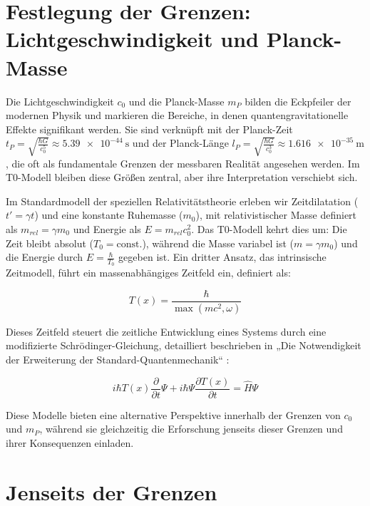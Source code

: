 \documentclass[a4paper,12pt]{article}
\newcommand{\Tfield}{T(x)}
\begin{document}
	\section{Festlegung der Grenzen: \\Lichtgeschwindigkeit und Planck-Masse}
	
	Die Lichtgeschwindigkeit \(c_0\) und die Planck-Masse \(m_P\) bilden die Eckpfeiler der modernen Physik und markieren die Bereiche, in denen quantengravitationelle Effekte signifikant werden. Sie sind verknüpft mit der Planck-Zeit \(t_P = \sqrt{\frac{\hbar G}{c_0^5}} \approx \SI{5.39e-44}{\second}\) und der Planck-Länge \(l_P = \sqrt{\frac{\hbar G}{c_0^3}} \approx \SI{1.616e-35}{\meter}\), die oft als fundamentale Grenzen der messbaren Realität angesehen werden. Im T0-Modell bleiben diese Größen zentral, aber ihre Interpretation verschiebt sich.
	
	Im Standardmodell der speziellen Relativitätstheorie erleben wir Zeitdilatation (\(t' = \gamma t\)) und eine konstante Ruhemasse (\(m_0\)), mit relativistischer Masse definiert als \(m_{rel} = \gamma m_0\) und Energie als \(E = m_{rel} c_0^2\). Das T0-Modell kehrt dies um: Die Zeit bleibt absolut (\(T_0 = \text{const.}\)), während die Masse variabel ist (\(m = \gamma m_0\)) und die Energie durch \(E = \frac{\hbar}{T_0}\) gegeben ist. Ein dritter Ansatz, das intrinsische Zeitmodell, führt ein massenabhängiges Zeitfeld ein, definiert als:
	
	\begin{equation}
		\Tfield = \frac{\hbar}{\max(m c^2, \omega)}
	\end{equation}
	
	Dieses Zeitfeld steuert die zeitliche Entwicklung eines Systems durch eine modifizierte Schrödinger-Gleichung, detailliert beschrieben in „Die Notwendigkeit der Erweiterung der Standard-Quantenmechanik“ \cite{pascher_quantum_2025}:
	
	\begin{equation}
		i\hbar \Tfield \frac{\partial}{\partial t} \Psi + i\hbar \Psi \frac{\partial \Tfield}{\partial t} = \hat{H} \Psi
	\end{equation}
	
	Diese Modelle bieten eine alternative Perspektive innerhalb der Grenzen von \(c_0\) und \(m_P\), während sie gleichzeitig die Erforschung jenseits dieser Grenzen und ihrer Konsequenzen einladen.
	
	\section{Jenseits der Grenzen}
	
\end{document}
